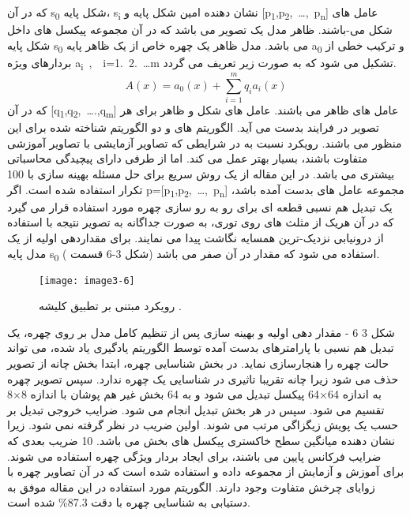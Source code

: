 که در آن
s\textsubscript{0}
شکل پایه،
s\textsubscript{i}
نشان دهنده  امین شکل پایه و
[p\textsubscript{1},p\textsubscript{2},\ \ldots,\ p\textsubscript{n}]
عامل های شکل می-باشند. ظاهر  مدل  یک تصویر  می باشد که در آن  مجموعه پیکسل های داخل شکل پایه
s\textsubscript{0}
می باشد. مدل ظاهر یک چهره خاص از یک ظاهر پایه
a\textsubscript{0}
و ترکیب خطی از بردارهای ویژه
a\textsubscript{i}\ ,\ \ i=1.\ 2.\ \ldots m
تشکیل می شود که به صورت زیر تعریف می گردد.
\begin{equation}\label{eq3-2}
A(x)=a_0(x)+\sum_{i=1}^{m}{q_ia_i(x)}
\end{equation}
\noindent
که در آن
[q\textsubscript{1},q\textsubscript{2},\ \ldots.,q\textsubscript{m}]
عامل های ظاهر می باشند. عامل های شکل و ظاهر برای هر تصویر در فرایند  بدست می آید. الگوریتم های  و  دو الگوریتم شناخته شده برای این منظور می باشند. رویکرد  نسبت به  در شرایطی که تصاویر آزمایشی با تصاویر آموزشی متفاوت باشند، بسیار بهتر عمل می کند. اما از طرفی دارای پیچیدگی محاسباتی بیشتری می باشد. در این مقاله از یک روش  سریع برای حل مسئله بهینه سازی با 100 تکرار استفاده شده است. اگر
p=[p\textsubscript{1},p\textsubscript{2},\ \ldots,\ p\textsubscript{n}]
مجموعه عامل های بدست آمده باشد، یک تبدیل هم نسبی قطعه ای   برای رو به رو سازی چهره مورد استفاده قرار می گیرد که در آن هریک از مثلث های روی توری، به صورت جداگانه به تصویر نتیجه با استفاده از درونیابی نزدیک-ترین همسایه  نگاشت پیدا می نمایند. برای مقداردهی اولیه از یک مدل پایه
s\textsubscript{0}
استفاده می شود که مقدار  در آن صفر می باشد (شکل 3-6 قسمت ). 
 \begin{figure}[h]
\centering
  \texttt{[image: image3-6]}
  \caption{رویکرد مبتنی بر تطبیق کلیشه  \cite{ref1}.}
  \label{image2-1}
\end{figure}
شکل ‏3 6 - مقدار دهی اولیه و بهینه سازی 
پس از تنظیم کامل مدل بر روی چهره، یک تبدیل هم نسبی با پارامترهای بدست آمده توسط الگوریتم یادگیری یاد شده، می تواند حالت چهره را هنجارسازی نماید. در بخش شناسایی چهره، ابتدا بخش چانه از تصویر حذف می شود زیرا چانه تقریبا تاثیری در شناسایی یک چهره ندارد. سپس تصویر چهره به اندازه 64×64 پیکسل تبدیل می شود و به 64 بخش غیر هم پوشان با اندازه 8×8 تقسیم می شود. سپس در هر بخش تبدیل   انجام می شود. ضرایب خروجی تبدیل  بر حسب یک پویش زیگزاگی مرتب می شوند. اولین ضریب در نظر گرفته نمی شود. زیرا نشان دهنده میانگین سطح خاکستری پیکسل های بخش می باشد. 10 ضریب بعدی که ضرایب فرکانس پایین می باشند، برای ایجاد بردار ویژگی چهره استفاده می شوند. برای آموزش و آزمایش از مجموعه داده  و  استفاده شده است که در آن تصاویر چهره با زوایای چرخش متفاوت وجود دارند. الگوریتم مورد استفاده در این مقاله موفق به دستیابی به شناسایی چهره با دقت 87.3\% شده است.
